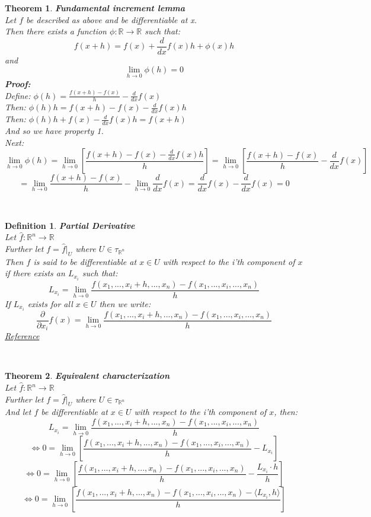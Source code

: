 \documentclass[12pt]{extarticle}
\theoremstyle{plain}
\newtheorem{thm}{Theorem}[section]
\theoremstyle{plain}
\theoremstyle{plain}
\theoremstyle{Definition}
\newtheorem{def.}{Definition}[section]
\theoremstyle{Definition}
\theoremstyle{plain}
\newcommand{\cut}[0]{\noindent\framebox[\linewidth]{\rule{\linewidth}{2pt}}\\}
\begin{document}
\begin{thm} \textbf{Fundamental increment lemma} \\ 
	Let $f$ be described as above and be differentiable at x. \\ 
	Then there exists a function $\phi : \mathbb{R} \to \mathbb{R}$ such that: \\ 
	$$f(x + h) = f(x) + \frac{d}{dx} f(x)h + \phi(x)h$$
	and 
	$$\lim_{h \to 0} \phi(h) = 0$$ 
	\textbf{Proof:} \\ 
	Define: $\phi(h) = \frac{f(x+h) - f(x)}{h} - \frac{d}{dx} f(x)$ \\ 
	Then: $\phi(h)h = f(x+h) - f(x) - \frac{d}{dx} f(x)h$ \\ 
	Then: $\phi(h)h + f(x) - \frac{d}{dx} f(x)h = f(x + h)$ \\ 
	And so we have property 1. \\ 
	Next: \\ 
	$$\lim_{h \to 0} \phi(h) = \lim_{h \to 0} \left[\frac{f(x+h) - f(x) - \frac{d}{dx} f(x)h}{h}\right] = \lim_{h \to 0} \left[\frac{f(x+h) - f(x)}{h} - \frac{d}{dx} f(x)\right] $$
	$$= \lim_{h \to 0}\frac{f(x+h) - f(x)}{h} - \lim_{h \to 0} \frac{d}{dx} f(x) = \frac{d}{dx} f(x) - \frac{d}{dx} f(x) = 0$$
\end{thm}
\cut
\begin{def.} \textbf{Partial Derivative} \\
	Let $\hat{f} : \mathbb{R}^n \to \mathbb{R}$ \\
	Further let $f = \hat{f}|_U$ where $U \in \tau_{\mathbb{R}^n}$ \\ 
	Then $f$ is said to be differentiable at $x \in U$ with respect to the i'th component of $x$ if there exists an $L_{x_i}$ such that: \\  
	$$L_{x_i} = \lim_{h \to 0} \frac{f(x_1,...,x_i + h,...,x_n) - f(x_1,...,x_i,...,x_n)}{h}$$
	If $L_{x_i}$ exists for all $x \in U$ then we write: \\ 
	$$\frac{\partial}{\partial x_i} f(x) = \lim_{h \to 0} \frac{f(x_1,...,x_i + h,...,x_n) - f(x_1,...,x_i,...,x_n)}{h}$$ 
	\href{https://en.wikipedia.org/wiki/Partial_derivative}{Reference}
\end{def.}
\cut
\begin{thm} \textbf{Equivalent characterization} \\ 
	Let $\hat{f} : \mathbb{R}^n \to \mathbb{R}$ \\
	Further let $f = \hat{f}|_U$ where $U \in \tau_{\mathbb{R}^n}$ \\ 
	And let $f$ be differentiable at $x \in U$ with respect to the i'th component of $x$, then: 
	$$L_{x_i} = \lim_{h \to 0} \frac{f(x_1,...,x_i + h,...,x_n) - f(x_1,...,x_i,...,x_n)}{h}$$
	$$\Leftrightarrow 0 = \lim_{h \to 0} \left[\frac{f(x_1,...,x_i + h,...,x_n) - f(x_1,...,x_i,...,x_n)}{h} - L_{x_i}\right]$$
	$$\Leftrightarrow 0 = \lim_{h \to 0} \left[\frac{f(x_1,...,x_i + h,...,x_n) - f(x_1,...,x_i,...,x_n)}{h} - \frac{L_{x_i} \cdot h}{h}\right]$$
	$$\Leftrightarrow 0 = \lim_{h \to 0} \left[\frac{f(x_1,...,x_i + h,...,x_n) - f(x_1,...,x_i,...,x_n) - \langle L_{x_i} , h \rangle}{h}  \right]$$	
\end{thm}
\end{document}
